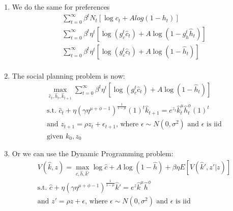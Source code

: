\documentclass[answers]{exam}
\begin{document}
\begin{questions}
\begin{parts}
\begin{solution}
\begin{enumerate}
            \item We do the same for preferences 
            \begin{align*}
                \sum_{t=0}^{\infty} \beta^t N_t [\log{c_t} + A log(1-h_t)]\\
                \sum_{t=0}^{\infty} \beta^t \eta^t [\log{(g_c^t \hat{c}_t)} + A \log(1-g_h^t \hat{h}_t)]\\
                \sum_{t=0}^{\infty} \beta^t \eta^t [\log{(g_c^t \hat{c}_t)} + A \log(1- \hat{h}_t)]\\
            \end{align*}
            \item The social planning problem is now:
            \begin{align*}
                \max_{\hat{c}_t,\hat{h}_t,\hat{k}_{t+1}}\sum_{t=0}^{\infty} \beta^t \eta^t [\log{(g_c^t \hat{c}_t)} + A \log(1- \hat{h}_t)]\\
                \text{s.t. } \hat{c}_t + \eta (\gamma \eta^{\mu + \phi -1})^{\frac{1}{1-\mu}} (1)^t \hat{k}_{t+1} = e^{z_t} \hat{k}_t^\mu \hat{h}_t^\phi (1)^t\\
                \text{and } z_{t+1} = \rho z_t + \epsilon_{t+1} \text{, where $\epsilon \sim N(0,\sigma^2)$ and $\epsilon$ is iid}\\
                \text{given $k_0, z_0$}
            \end{align*}
            \item Or we can use the Dynamic Programming problem:
            \begin{align*}
                V(\hat{k},z) = \max_{\hat{c},\hat{h},\hat{k}'} \log{\hat{c} + A \log(1-\hat{h})} + \beta \eta E[V(\hat{k}',z'|z)]\\
                \text{s.t. } \hat{c} + \eta (\gamma \eta^{\mu + \phi -1})^{\frac{1}{1-\mu}} \hat{k}' = e^{z} \hat{k}^\mu \hat{h}^\phi\\
                \text{and } z' = \rho z + \epsilon \text{, where $\epsilon \sim N(0,\sigma^2)$ and $\epsilon$ is iid}
            \end{align*}
        \end{enumerate}

        \end{solution}

\end{parts}
\end{questions}
\end{document}
